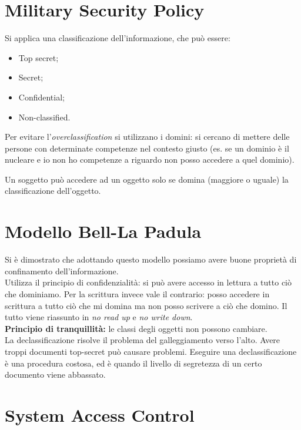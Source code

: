 \section{Military Security Policy}

Si applica una classificazione dell'informazione, che può essere:
\begin{itemize}
 \item Top secret;
 \item Secret;
 \item Confidential;
 \item Non-classified.
\end{itemize}

Per evitare l'\textit{overclassification} si utilizzano i domini: si cercano
di mettere delle persone con determinate competenze nel contesto giusto (es.
se un dominio è il nucleare e io non ho competenze a riguardo non posso
accedere a quel dominio).

Un soggetto può accedere ad un oggetto solo se domina (maggiore o uguale) la
classificazione dell'oggetto.

\section{Modello Bell-La Padula}

Si è dimostrato che adottando questo modello possiamo avere buone proprietà di
confinamento dell'informazione.\\
Utilizza il principio di confidenzialità: si può avere accesso in lettura a
tutto ciò che dominiamo. Per la scrittura invece vale il contrario: posso
accedere in scrittura a tutto ciò che mi domina ma non posso scrivere a ciò che
domino. Il tutto viene riassunto in \textit{no read up} e \textit{no write
down}.\\
\newline
\textbf{Principio di tranquillità:} le classi degli oggetti non possono
cambiare.\\
\newline
La declassificazione risolve il problema del galleggiamento verso l'alto. Avere
troppi documenti top-secret può causare problemi. Eseguire una
declassificazione è una procedura costosa, ed è quando il livello di segretezza
di un certo documento viene abbassato.

\section{System Access Control}

